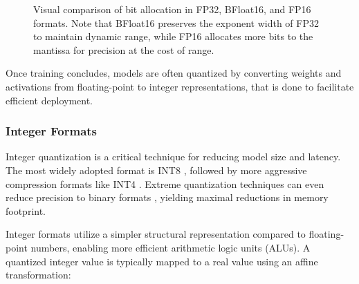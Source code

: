 \begin{figure}[H]
  \caption{Visual comparison of bit allocation in FP32, BFloat16, and FP16 formats. Note that BFloat16 preserves the exponent width of FP32 to maintain dynamic range, while FP16 allocates more bits to the mantissa for precision at the cost of range.}
  \label{fig:dtypes}
\end{figure}

Once training concludes, models are often quantized by converting weights and activations from floating-point to integer representations, that is done to facilitate efficient deployment.

\subsubsection{Integer Formats}

Integer quantization is a critical technique for reducing model size and latency. The most widely adopted format is INT8 \cite{jacob2018quantization, dettmers2022gpt3int8}, followed by more aggressive compression formats like INT4 \cite{wu2023understanding}. Extreme quantization techniques can even reduce precision to binary formats \cite{hubara2016binarized}, yielding maximal reductions in memory footprint.

Integer formats utilize a simpler structural representation compared to floating-point numbers, enabling more efficient arithmetic logic units (ALUs). A quantized integer value is typically mapped to a real value using an affine transformation:

